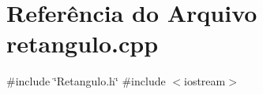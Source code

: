 \section{Referência do Arquivo retangulo.\+cpp}
\label{retangulo_8cpp}
{\ttfamily \#include \char`\"{}Retangulo.\+h\char`\"{}}\newline
{\ttfamily \#include $<$iostream$>$}\newline
